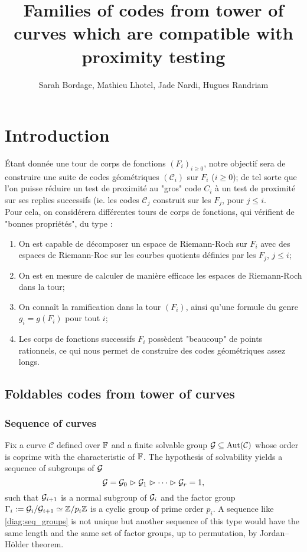 \documentclass[10pt]{article}
\title{Families of codes from tower of curves which are compatible with proximity testing}
\author{Sarah Bordage, Mathieu Lhotel, Jade Nardi, Hugues Randriam}
\begin{document}
\maketitle

\section{Introduction}

Étant donnée une tour de corps de fonctions $(F_i)_{i \geq 0}$, notre objectif sera de construire une suite de codes géométriques $(\mathcal{C}_i)$ sur $F_i$ ($i \geq 0$); de tel sorte que l'on puisse réduire un test de proximité au "gros" code $C_i$ à un test de proximité sur ses replies successifs (ie. les codes $\mathcal{C}_j$ construit sur les $F_j$, pour $j \leq i$. \\
Pour cela, on considérera différentes tours de corps de fonctions, qui vérifient de "bonnes propriétés", du type :
\begin{enumerate}
\item On est capable de décomposer un espace de Riemann-Roch sur $F_i$ avec des espaces de Riemann-Roc sur les courbes quotients définies par les $F_j$, $j \leq i$;
\item On est en mesure de calculer de manière efficace les espaces de Riemann-Roch dans la tour;
\item On connaît la ramification dans la tour $(F_i)$, ainsi qu'une formule du genre $g_i = g(F_i)$ pour tout $i$;
\item Les corps de fonctions successifs $F_i$ possèdent "beaucoup" de points rationnels, ce qui nous permet de construire des codes géométriques assez longs.
\end{enumerate}

\subsection{Foldables codes from tower of curves}




\subsubsection{Sequence of curves}
Fix a curve $\mathcal{C}$ defined over $\mathbb{F}$ and a finite solvable group $\mathcal{G} \subseteq \operatorname{Aut}(\mathcal{C})$ whose order is coprime with the characteristic of $\mathbb{F}$. The hypothesis of solvability yields a sequence of subgroups of $\mathcal{G}$
\begin{equation}\label{diag:seq_groups}
	\mathcal{G}=\mathcal{G}_0 \vartriangleright \mathcal{G}_1 \vartriangleright \dots \vartriangleright \mathcal{G}_r = 1,  
\end{equation}
such that $\mathcal{G}_{i+1}$ is a normal subgroup of $\mathcal{G}_i$ and the factor group $\Gamma_i := \mathcal{G}_i /\mathcal{G}_{i+1} \simeq \mathbb{Z}/p_i \mathbb{Z}$ is a cyclic group of prime order $p_i$. A sequence like \eqref{diag:seq_groups} is not unique but another sequence of this type would have the same length and the same set of factor groups, up to permutation, by Jordan–Hölder theorem.
\end{document}

